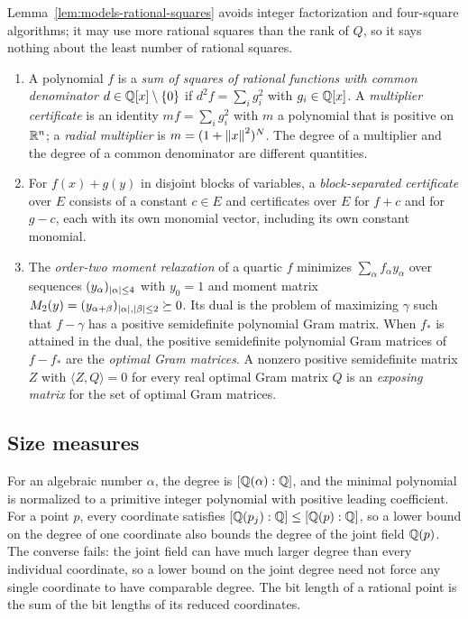 Lemma~\ref{lem:models-rational-squares} avoids integer factorization and
four-square algorithms; it may use more rational squares than the rank of
$Q$, so it says nothing about the least number of rational squares.

\begin{definition}
\label{def:models-formats}
\leavevmode
\begin{enumerate}[label=(\alph*)]
\item A polynomial $f$ is a \emph{sum of squares of rational functions with
  common denominator} $d\in\mathbb Q[x]\setminus\{0\}$ if $d^2f=\sum_ig_i^2$ with
  $g_i\in\mathbb Q[x]$. A \emph{multiplier certificate} is an identity
  $mf=\sum_ig_i^2$ with $m$ a polynomial that is positive on $\mathbb R^n$; a
  \emph{radial multiplier} is $m=(1+\left\lVert x\right\rVert^2)^N$. The degree of a multiplier
  and the degree of a common denominator are different quantities.
\item For $f(x)+g(y)$ in disjoint blocks of variables, a \emph{block-separated
  certificate} over $E$ consists of a constant $c\in E$ and certificates over
  $E$ for $f+c$ and for $g-c$, each with its own monomial vector, including
  its own constant monomial.
\item The \emph{order-two moment relaxation} of a quartic $f$ minimizes
  $\sum_\alpha f_\alpha y_\alpha$ over sequences $(y_\alpha)_{\left\lvert\alpha\right\rvert\le4}$
  with $y_0=1$ and moment matrix
    $M_2(y)=(y_{\alpha+\beta})_{\left\lvert\alpha\right\rvert,\left\lvert\beta\right\rvert\le2}\succeq0$. Its dual
  is the
  problem of maximizing $\gamma$ such that $f-\gamma$ has a positive
  semidefinite polynomial Gram matrix. When $f_*$ is attained in the dual,
  the positive semidefinite polynomial Gram matrices of $f-f_*$ are the
  \emph{optimal Gram matrices}. A nonzero positive semidefinite matrix $Z$
  with $\langle Z,Q\rangle=0$ for every real optimal Gram matrix $Q$ is an
  \emph{exposing matrix} for the set of optimal Gram matrices.
\end{enumerate}
\end{definition}

\subsection{Size measures}
\label{sec:models-size}

For an algebraic number $\alpha$, the degree is $[\mathbb Q(\alpha):\mathbb Q]$, and the
minimal polynomial is normalized to a primitive integer polynomial with
positive leading coefficient. For a point $p$, every coordinate satisfies
$[\mathbb Q(p_j):\mathbb Q]\le[\mathbb Q(p):\mathbb Q]$, so a lower bound on the degree of one
coordinate also bounds the degree of the joint field $\mathbb Q(p)$. The converse
fails: the joint field can have much larger degree than every individual
coordinate, so a lower bound on the joint degree need not force any single
coordinate to have comparable degree. The bit
length of a rational point is the sum of the bit lengths of its reduced
coordinates.

